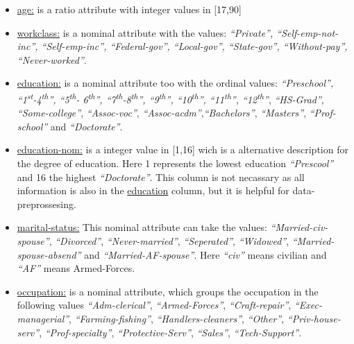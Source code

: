 \documentclass{article}[a4paper,12pt]
\begin{document}
    \begin{itemize}
        \item \underline{age:} is a ratio attribute with integer values in [17,90]
        \item \underline{workclass:} is a nominal attribute with the values: \textit{\enquote{Private}, \enquote{Self-emp-not-inc}, \enquote{Self-emp-inc}, \enquote{Federal-gov}, \enquote{Local-gov}, \enquote{State-gov}, \enquote{Without-pay}, \enquote{Never-worked}}.
        \item \underline{education:} is a nominal attribute too with the ordinal values: \textit{\enquote{Preschool}, \enquote{1\textsuperscript{st}-4\textsuperscript{th}}, \enquote{5\textsuperscript{th}- 6\textsuperscript{th}}, 
        \enquote{7\textsuperscript{th}-8\textsuperscript{th}}, \enquote{9\textsuperscript{th}}, \enquote{10\textsuperscript{th}}, \enquote{11\textsuperscript{th}}, 
        \enquote{12\textsuperscript{th}}}, \textit{\enquote{HS-Grad}}, \textit{\enquote{Some-college}}, 
        \textit{\enquote{Assoc-voc}}, \textit{\enquote{Assoc-acdm}},\textit{\enquote{Bachelors}},
        \textit{\enquote{Masters}}, \textit{\enquote{Prof-school}} and \textit{\enquote{Doctorate}}.
        \item \underline{education-nom:} is a integer value in [1,16] wich is a alternative description for the degree of education. Here 1 represents the lowest education \textit{\enquote{Prescool}} and 16 the highest \textit{\enquote{Doctorate}}. This column is not necassary as all information is also in the \underline{education} column, but it is helpful for data-preprossesing.
        \item \underline{marital-status:} This nominal attribute can take the values: 
        \textit{\enquote{Married-civ-spouse}}, \textit{\enquote{Divorced}}, \textit{\enquote{Never-married}}, \textit{\enquote{Seperated}}, \textit{\enquote{Widowed}}, \textit{\enquote{Married-spouse-absend}} and \textit{\enquote{Married-AF-spouse}}. Here \textit{\enquote{civ}} means civilian and 
        \textit{\enquote{AF}} means Armed-Forces.
        \item \underline{occupation:} is a nominal attribute, which groups the occupation in the following values 
        \textit{\enquote{Adm-clerical}}, \textit{\enquote{Armed-Forces}}, \textit{\enquote{Craft-repair}},
        \textit{\enquote{Exec-managerial}}, \textit{\enquote{Farming-fishing}}, \textit{\enquote{Handlers-cleaners}},
        \textit{\enquote{Other}}, \textit{\enquote{Priv-house-serv}}, \textit{\enquote{Prof-specialty}}, \textit{\enquote{Protective-Serv}}, \textit{\enquote{Sales}}, \textit{\enquote{Tech-Support}}.

\end{itemize}
\end{document}
